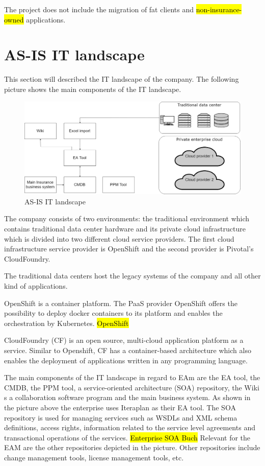 The project does not include the migration of fat clients and \hl{non-insurance-owned} applications.

\section{AS-IS IT landscape}\label{section:asislandscape}

This section will described the IT landscape of the company. The following picture shows the main components of the IT landscape.

\begin{figure}[htpb]
  \centering
  \includegraphics[width=1.0\textwidth]{figures/as-is-it-landscape.png}
  \caption{ AS-IS IT landscape}
  \label{fig:AS-IS IT landscape}
\end{figure}

The company consists of two environments: the traditional environment which contains traditional data center hardware and its private cloud infrastructure which is divided into two different cloud service providers. The first cloud infrastructure service provider is OpenShift and the second provider is Pivotal's CloudFoundry.

The traditional data centers host the legacy systems of the company and all other kind of applications.

OpenShift is a container platform. The PaaS provider OpenShift offers the possibility to deploy docker containers to its platform and enables the orchestration by Kubernetes. \hl{OpenShift}

CloudFoundry (CF) is an open source, multi-cloud application platform as a service. Similar to Openshift, CF has a container-based architecture which also enables the deployment of applications written in any programming language.

The main components of the IT landscape in regard to EAm are the EA tool, the CMDB, the PPM tool, a service-oriented architecture (SOA) repository, the Wiki s a collaboration software program and the main business system. As shown in the picture above the enterprise uses Iteraplan as their EA tool. %
The SOA repository is used for managing services such as WSDLs and XML schema definitions, access rights, information related to the service level agreements and transactional operations of the services. \hl{Enterprise SOA Buch} 
Relevant for the EAM are the other repositories depicted in the picture. Other repositories include change management tools, license management tools, etc.

